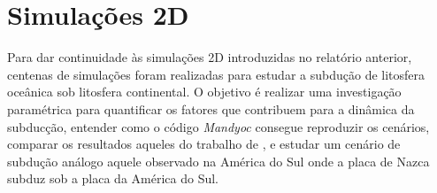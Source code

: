 \chapter{Simulações 2D}
\label{simulacoes}

Para dar continuidade às simulações 2D introduzidas no relatório anterior, centenas de simulações foram realizadas para estudar a subdução de litosfera oceânica sob litosfera continental. O objetivo é realizar uma investigação paramétrica para quantificar os fatores que contribuem para a dinâmica da subducção, entender como o código \textit{Mandyoc} \citep{sacek2022mandyoc} consegue reproduzir os cenários, comparar os resultados aqueles do trabalho de \citet{strak2021thermo}, e estudar um cenário de subdução análogo aquele observado na América do Sul onde a placa de Nazca subduz sob a placa da América do Sul.





